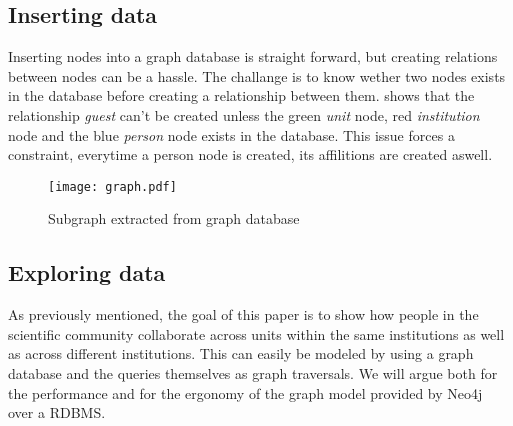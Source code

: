 \subsection*{Inserting data}
Inserting nodes into a graph database is straight forward, but creating relations between nodes can be a hassle. The challange is to know wether two nodes exists in the database before creating a relationship between them.  shows that the relationship \textit{guest} can't be created unless the green \textit{unit} node, red \textit{institution} node and the blue \textit{person} node exists in the database. This issue forces a constraint, everytime a person node is created, its affilitions are created aswell.

\begin{figure}[h]
  \centering
  \texttt{[image: graph.pdf]}
  \caption{Subgraph extracted from graph database}
  \label{fig:subgraph}
\end{figure}


\subsection*{Exploring data}
As previously mentioned, the goal of this paper is to show how people in the scientific community collaborate across units within the same institutions as well as across different institutions.
This can easily be modeled by using a graph database and the queries themselves as graph traversals.
We will argue both for the performance and for the ergonomy of the graph model provided by Neo4j over a RDBMS.
